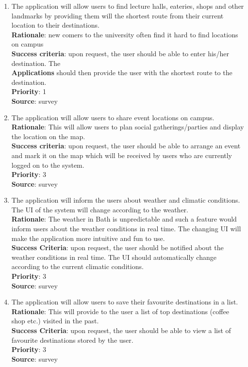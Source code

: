 \documentclass[10pt,a4paper,oneside]{report}
\begin{document}
{\begin{enumerate}
{  \textbf{Priority}: 1\\
  \textbf{Source}: survey.
}
\item{The application will allow users to find lecture halls, eateries, shops and other landmarks by providing them will the shortest route from their current location to their destinations. \\
  \textbf{Rationale}: new comers to the university often find it hard to find locations on campus\\
  \textbf{Success criteria}: upon request, the user should be able to enter his/her destination. The\\
  \textbf{Applications} should then provide the user with the shortest route to the destination.\\
  \textbf{Priority}: 1\\
  \textbf{Source}: survey
}
\item{The application will allow users to share event locations on campus. \\
  \textbf{Rationale}: This will allow users to plan social gatherings/parties and display the location on the map.\\
  \textbf{Success criteria}: upon request, the user should be able to arrange an event and mark it on the map which will be received by users who are currently logged on to the system.\\
  \textbf{Priority}: 3\\
  \textbf{Source}: survey
}

\item{The application will inform the users about weather and climatic conditions. The UI of the system will change according to the weather.\\
  \textbf{Rationale}: The weather in Bath is unpredictable and such a feature would inform users about the weather conditions in real time. The changing UI will make the application more intuitive and fun to use.\\
  \textbf{Success Criteria}: upon request, the user should be notified about the weather conditions in real time. The UI should automatically change according to the current climatic conditions.\\
  \textbf{Priority}: 3\\
  \textbf{Source}: survey
}

\item{The application will allow users to save their favourite destinations in a list.\\
  \textbf{Rationale}: This will provide to the user a list of top destinations (coffee shop etc.) visited in the past.\\
  \textbf{Success Criteria}: upon request, the user should be able to view a list of favourite destinations stored by the user.\\
  \textbf{Priority}: 3\\
  \textbf{Source}: survey
}


\end{enumerate}}
\end{document}
